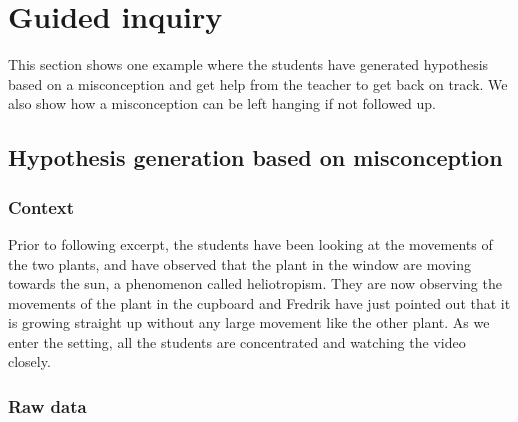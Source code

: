 \section{Guided inquiry}
This section shows one example where the students have generated hypothesis based on a misconception and get help from the teacher to get back on track. We also show how a misconception can be left hanging if not followed up.

\subsection{Hypothesis generation based on misconception}

\subsubsection*{Context}
Prior to following excerpt, the students have been looking at the movements of the two plants, and have observed that the plant in the window are moving towards the sun, a phenomenon called heliotropism. They are now observing the movements of the plant in the cupboard and Fredrik have just pointed out that it is growing straight up without any large movement like the other plant. As we enter the setting, all the students are concentrated and watching the video closely.


\subsubsection*{Raw data}

